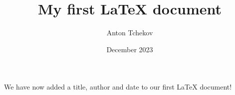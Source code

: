 \documentclass[12pt, letterpaper]{article}
\title{My first LaTeX document}
\author{Anton Tchekov}
\date{December 2023}
\begin{document}
\maketitle
We have now added a title, author and date to our first \LaTeX{} document!
\end{document}
